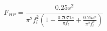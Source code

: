 \begin{equation}
F_{HP} = \frac{0.25 s^{2}}{\pi^{2} f_{l}^{2} \left(1 + \frac{0.7071 s}{\pi f_{l}} + \frac{0.25 s^{2}}{\pi^{2} f_{l}^{2}}\right)}
\end{equation}

